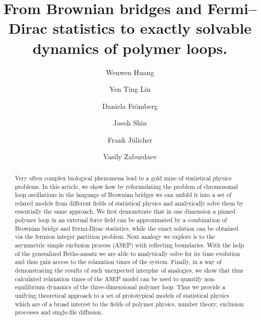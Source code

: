 \documentclass[aps,showpacs,twocolumn,floatfix,prx,superscriptaddress]{revtex4-1}
\begin{document}
\title{From Brownian bridges and Fermi--Dirac statistics to exactly solvable dynamics of polymer loops.}

\author{Wenwen Huang}
\author{Yen Ting Lin}
\author{Daniela Fr\"{o}mberg}
\author{Jaeoh Shin}
\author{Frank J\"{u}licher}
\author{Vasily Zaburdaev}


\begin{abstract}
{Very often complex biological phenomena lead to a gold mine of statistical physics problems. In this article, we show how by reformulating the problem of chromosomal loop oscillations in the language of Brownian bridges we can unfold it into a set of related models from different fields of statistical physics and analytically solve them by essentially the same approach. We first demonstrate that in one dimension a pinned polymer loop in an external force field can be approximated by a combination of Brownian bridge and Fermi-Dirac statistics, while the exact solution can be obtained via the fermion integer partition problem. Next analogy we explore is to the asymmetric simple exclusion process (ASEP) with reflecting boundaries. With the help of the generalized Bethe-ansatz we are able to analytically solve for its time evolution and thus gain access to the relaxation times of the system. Finally, in a way of demonstrating the results of such unexpected interplay of analogies, we show that thus calculated relaxation times of the ASEP model can be used to quantify non-equilibrium dynamics of the three-dimensional polymer loop. Thus we provide a unifying theoretical approach to a set of prototypical models of statistical physics which are of a broad interest to the fields of polymer physics, number theory, exclusion processes and single-file diffusion.}
\end{abstract}
\maketitle
\end{document}
